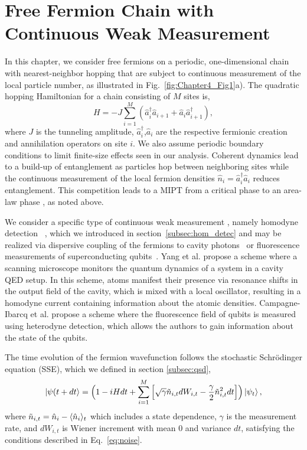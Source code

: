 \section{Free Fermion Chain with Continuous Weak Measurement}

In this chapter, we consider free fermions on a periodic, one-dimensional chain with nearest-neighbor hopping that are subject to continuous measurement of the local particle number, as illustrated in Fig.~\ref{fig:Chapter4_Fig1}a). The quadratic hopping Hamiltonian for a chain consisting of $M$ sites is, 
\begin{equation}
H =-J \sum\limits_{i=1}^{M} ( \hat{a}^{\dagger}_i \hat{a}_{i+1} + \hat{a}_i \hat{a}^{\dagger}_{i+1}),
\end{equation}
where $J$ is the tunneling amplitude, $\hat{a}^{\dagger}_i$,$\hat{a}_i$ are the respective fermionic creation and annihilation operators on site $i$. We also assume periodic boundary conditions to limit finite-size effects seen in our analysis. Coherent dynamics lead to a build-up of entanglement as particles hop between neighboring sites while the continuous measurement of the local fermion densities $\hat{n}_i = \hat{a}_i^\dagger \hat{a}_i$ reduces entanglement. This competition leads to a MIPT from a critical phase to an area-law phase \cite{alberton2021}, as noted above. 

We consider a specific type of continuous weak measurement \cite{wiseman2009,jacobs2006}, namely homodyne detection ~\cite{barchielli1991,gisin1992,wiseman1993}, which we introduced in section~\ref{subsec:hom_detec} and may be realized via dispersive coupling of the fermions to cavity photons~\cite{yang2018} or fluorescence measurements of superconducting qubits~\cite{campagne-ibarcq2016}. Yang et al. propose a scheme where a scanning microscope monitors the quantum dynamics of a system in a cavity QED setup. In this scheme, atoms manifest their presence via resonance shifts in the output field of the cavity, which is mixed with a local oscillator, resulting in a homodyne current containing information about the atomic densities. Campagne-Ibarcq et al. propose a scheme where the fluorescence field of qubits is measured using heterodyne detection, which allows the authors to gain information about the state of the qubits. 

The time evolution of the fermion wavefunction follows the stochastic Schr\"{o}dinger equation (SSE), which we defined in section \ref{subsec:qsd},
\begin{equation}
\label{eq:SSE1}
    \ket{\psi(t+dt} = \Big(1-iH dt + \sum\limits_{i=1}^M\Big[ \sqrt{\gamma} \tilde n_{i,t} dW_{i,t}- \frac{\gamma}{2} \tilde n_{i,t}^2 dt\Big]  \Big) \ket{\psi_t},   
\end{equation}
where $\tilde n_{i,t} = \hat{n}_i - \langle\hat{n}_i\rangle_t$ which includes a state dependence, $\gamma$ is the measurement rate, and $dW_{i,t}$ is Wiener increment with mean $0$ and variance $dt$, satisfying the conditions described in Eq.~\ref{eq:noise}.

